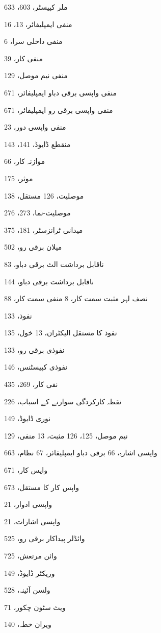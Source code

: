 \begin{theindex}
\item ملر کپیسٹر، 603، 633
\item منفی ایمپلیفائر، 13، 16
\item منفی داخلی سرا، 6
\item منفی کار، 39
\item منفی نیم موصل، 129
\item منفی واپسی برقی دباو ایمپلیفائر، 671
\item منفی واپسی برقی رو ایمپلیفائر، 671
\item منفی واپسی دور، 23
\item منقطع ڈایوڈ، 141، 143
\item موازنہ کار، 66
\item موثر، 175
\item موصلیت، 126 
     \subitem مستقل، 138
\item موصلیت-نما، 273، 276
\item میدانی ٹرانزسٹر، 181، 375
\item میلان برقی رو، 502

\indexspace

\item ناقابل برداشت الٹ برقی دباو، 83
\item ناقابل برداشت برقی دباو، 144
\item نصف لہر 
     \subitem مثبت سمت کار، 8 
     \subitem منفی سمت کار، 88
\item نفوذ، 133
\item نفوذ کا مستقل 
     \subitem الیکٹران، 13 
     \subitem خول، 135
\item نفوذی برقی رو، 133
\item نفوذی کپیسٹنس، 146
\item نفی کار، 269، 435
\item نقطہ کارکردگی سوارنے کے اسباب، 226
\item نوری ڈایوڈ، 149
\item نیم موصل، 125، 126 
     \subitem مثبت، 13 
     \subitem منفی، 129

\indexspace

\item واپسی 
     \subitem اشارہ، 66 
     \subitem برقی دباو ایمپلیفائر، 67 
     \subitem نظام، 663
\item واپس کار، 671
\item واپس کار کا مستقل، 673
\item واپسی ادوار، 21
\item واپسی اشارات، 21
\item وائڈلر پیداکار برقی رو، 525
\item وائن مرتعش، 725
\item وریکٹر ڈایوڈ، 149
\item ولسن آئینہ، 528
\item ویٹ سٹون چکور، 71
\item ویران خطہ، 140


\end{theindex}
